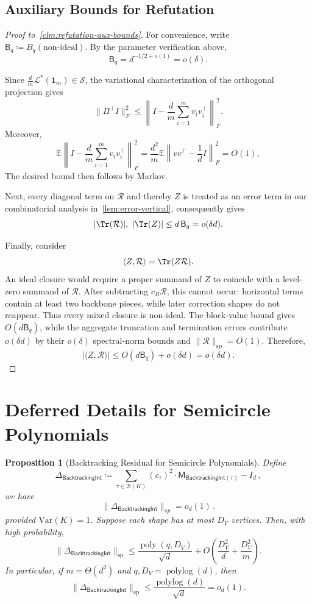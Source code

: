 \documentclass[12pt]{article}
\def \E {\mathbb{E}}
\newcommand{\Var}{\mathrm{Var}}
\def\1{\bm{1}}
\newtheorem{proposition}[theorem]{Proposition}
\newcommand{\poly}{\operatorname{poly}}
\newcommand{\polylog}{\operatorname{polylog}}
\newcommand{\calB}{\mathcal{B}}
\newcommand{\calR}{\mathcal{R}}
\newcommand{\calS}{\mathcal{S}}
\newcommand{\cm}{\mathsf{M} }
\newcommand{\bti}{\mathsf{BacktrackingInt}}
\newcommand{\calL}{\mathcal{L}}
\begin{document}
\subsection{Auxiliary Bounds for Refutation}

\begin{proof}[Proof to~\cref{clm:refutation-aux-bounds}]
For convenience, write
\(
    \mathsf B_q\coloneqq B_q(\mathrm{non\text{-}ideal}).
\)
By the parameter verification above,
\[
    \mathsf B_q=d^{-1/2+o(1)}=o(\delta).
\]

Since \(\frac d m\calL^*(\1_m)\in\calS\), the variational
characterization of the orthogonal projection gives
\[
    \|\Pi^\perp I\|_F^2
    \leq
    \left\|I-\frac d m\sum_{i=1}^m v_iv_i^\top\right\|_F^2.
\]
Moreover,
\[
    \E\left\|I-\frac d m\sum_{i=1}^m v_iv_i^\top\right\|_F^2
    =
    \frac{d^2}{m}
    \E\left\|vv^\top-\frac1dI\right\|_F^2
    =
    O(1),
\]
The desired bound then follows by Markov.

Next, every diagonal term on $\calR$ and thereby $Z$ is treated as an error term in our combinatorial analysis in~\cref{lem:error-vertical}, consequently gives
\[
    |\Tr(\calR)|,\ |\Tr(Z)|
    \leq d\,\mathsf B_q
    =
    o(\delta d).
\]

Finally, consider
\[
    \langle Z,\calR\rangle=\Tr(Z\calR).
\]
An ideal closure would require a proper summand of \(Z\) to coincide
with a level-zero summand of \(\calR\). After subtracting
\(c_R\calR\), this cannot occur: horizontal terms contain at least two
backbone pieces, while later correction shapes do not reappear. Thus every mixed closure is non-ideal.
The block-value bound gives \(O(d\mathsf B_q)\), while the aggregate
truncation and termination errors contribute \(o(\delta d)\) by their
\(o(\delta)\) spectral-norm bounds and
\(\|\calR\|_{\mathrm{sp}}=O(1)\). Therefore,
\[
    |\langle Z,\calR\rangle|
    \leq O(d\mathsf B_q)+o(\delta d)
    =
    o(\delta d).
\]
\end{proof}




\section{Deferred Details for Semicircle Polynomials}
\label{app:def-Q}
\begin{proposition}[Backtracking Residual for Semicircle Polynomials]
\label{prop:sc-backtracking-residual}
Define \[ 
	\Delta_{\bti} \coloneqq  \sum _{\tau \in \calB(K)} (c_\tau)^2 \cdot  \cm_{\bti(\tau)} - I_d \,,	\]
	we have \[ 
	\|\Delta_{\bti}\|_{sp} = o_d(1)\,.
	\]
	provided $\Var(K)=1$. Suppose each shape has at most $D_V$ vertices. Then, with high probability,
\[
    \|\Delta_{\bti}\|_{\mathrm{sp}}
    \leq
    \frac{\poly(q,D_V)}{\sqrt d}
    +
    O\left(
        \frac{D_V^2}{d}
        +
        \frac{D_V^2}{m}
    \right).
\]
In particular, if \(m=\Theta(d^2)\) and \(q,D_V=\polylog(d)\), then
\[
    \|\Delta_{\bti}\|_{\mathrm{sp}}
    \leq
    \frac{\polylog(d)}{\sqrt d}
    =
    o_d(1).
\]
\end{proposition}
\end{document}
